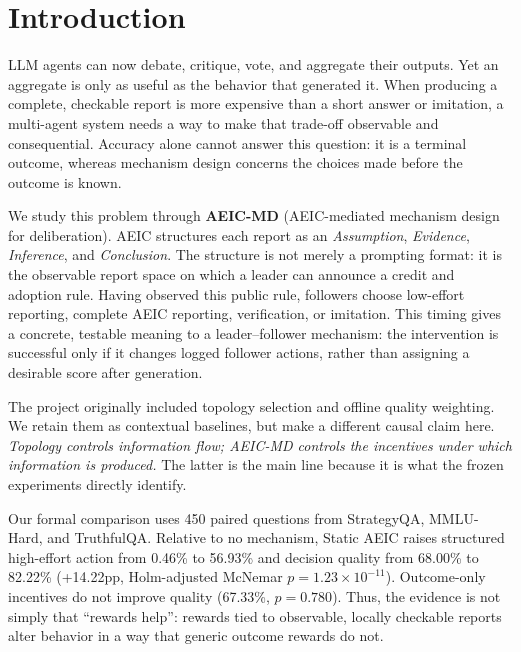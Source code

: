 \section{Introduction}
\label{sec:intro}

LLM agents can now debate, critique, vote, and aggregate their outputs.  Yet an aggregate is only as useful as the behavior that generated it.  When producing a complete, checkable report is more expensive than a short answer or imitation, a multi-agent system needs a way to make that trade-off observable and consequential.  Accuracy alone cannot answer this question: it is a terminal outcome, whereas mechanism design concerns the choices made before the outcome is known.

We study this problem through \textbf{AEIC-MD} (AEIC-mediated mechanism design for deliberation).  AEIC structures each report as an \emph{Assumption}, \emph{Evidence}, \emph{Inference}, and \emph{Conclusion}.  The structure is not merely a prompting format: it is the observable report space on which a leader can announce a credit and adoption rule.  Having observed this public rule, followers choose low-effort reporting, complete AEIC reporting, verification, or imitation.  This timing gives a concrete, testable meaning to a leader--follower mechanism: the intervention is successful only if it changes logged follower actions, rather than assigning a desirable score after generation.

The project originally included topology selection and offline quality weighting.  We retain them as contextual baselines, but make a different causal claim here.  \emph{Topology controls information flow; AEIC-MD controls the incentives under which information is produced.}  The latter is the main line because it is what the frozen experiments directly identify.

Our formal comparison uses 450 paired questions from StrategyQA, MMLU-Hard, and TruthfulQA.  Relative to no mechanism, Static AEIC raises structured high-effort action from 0.46\% to 56.93\% and decision quality from 68.00\% to 82.22\% (+14.22pp, Holm-adjusted McNemar $p=1.23\times10^{-11}$).  Outcome-only incentives do not improve quality (67.33\%, $p=0.780$).  Thus, the evidence is not simply that ``rewards help'': rewards tied to observable, locally checkable reports alter behavior in a way that generic outcome rewards do not.


